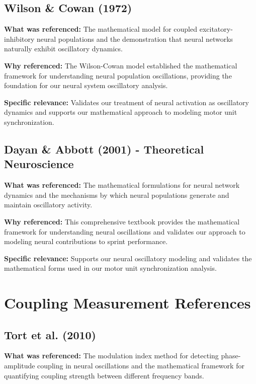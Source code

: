 \documentclass{article}
\begin{document}
\subsection{Wilson \& Cowan (1972)}

\textbf{What was referenced:} The mathematical model for coupled excitatory-inhibitory neural populations and the demonstration that neural networks naturally exhibit oscillatory dynamics.

\textbf{Why referenced:} The Wilson-Cowan model established the mathematical framework for understanding neural population oscillations, providing the foundation for our neural system oscillatory analysis.

\textbf{Specific relevance:} Validates our treatment of neural activation as oscillatory dynamics and supports our mathematical approach to modeling motor unit synchronization.

\subsection{Dayan \& Abbott (2001) - Theoretical Neuroscience}

\textbf{What was referenced:} The mathematical formulations for neural network dynamics and the mechanisms by which neural populations generate and maintain oscillatory activity.

\textbf{Why referenced:} This comprehensive textbook provides the mathematical framework for understanding neural oscillations and validates our approach to modeling neural contributions to sprint performance.

\textbf{Specific relevance:} Supports our neural oscillatory modeling and validates the mathematical forms used in our motor unit synchronization analysis.

\section{Coupling Measurement References}

\subsection{Tort et al. (2010)}

\textbf{What was referenced:} The modulation index method for detecting phase-amplitude coupling in neural oscillations and the mathematical framework for quantifying coupling strength between different frequency bands.
\end{document}
